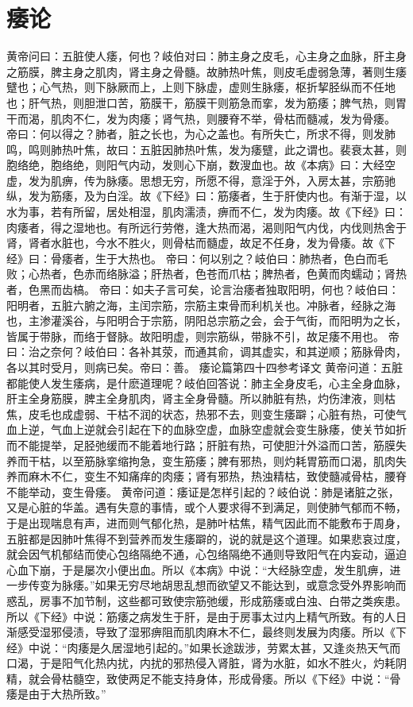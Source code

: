 \documentclass[a4paper,12pt,UTF8,twoside]{ctexbook}
\begin{document}
\chapter{痿论}
黄帝问曰：五脏使人痿，何也？岐伯对曰：肺主身之皮毛，心主身之血脉，肝主身之筋膜，脾主身之肌肉，肾主身之骨髓。故肺热叶焦，则皮毛虚弱急薄，著则生痿躄也；心气热，则下脉厥而上，上则下脉虚，虚则生脉痿，枢折挈胫纵而不任地也；肝气热，则胆泄口苦，筋膜干，筋膜干则筋急而挛，发为筋痿；脾气热，则胃干而渴，肌肉不仁，发为肉痿；肾气热，则腰脊不举，骨枯而髓减，发为骨痿。
帝曰：何以得之？肺者，脏之长也，为心之盖也。有所失亡，所求不得，则发肺鸣，鸣则肺热叶焦，故曰：五脏因肺热叶焦，发为痿躄，此之谓也。裴衰太甚，则胞络绝，胞络绝，则阳气内动，发则心下崩，数溲血也。故《本病》曰：大经空虚，发为肌痹，传为脉痿。思想无穷，所愿不得，意淫于外，入房太甚，宗筋驰纵，发为筋痿，及为白淫。故《下经》曰：筋痿者，生于肝使内也。有渐于湿，以水为事，若有所留，居处相湿，肌肉濡渍，痹而不仁，发为肉痿。故《下经》曰：肉痿者，得之湿地也。有所远行劳倦，逢大热而渴，渴则阳气内伐，内伐则热舍于肾，肾者水脏也，今水不胜火，则骨枯而髓虚，故足不任身，发为骨痿。故《下经》曰：骨痿者，生于大热也。
帝曰：何以别之？岐伯曰：肺热者，色白而毛败；心热者，色赤而络脉溢；肝热者，色苍而爪枯；脾热者，色黄而肉蠕动；肾热者，色黑而齿槁。
帝曰：如夫子言可矣，论言治痿者独取阳明，何也？岐伯曰：阳明者，五脏六腑之海，主闰宗筋，宗筋主束骨而利机关也。冲脉者，经脉之海也，主渗灌溪谷，与阳明合于宗筋，阴阳总宗筋之会，会于气街，而阳明为之长，皆属于带脉，而络于督脉。故阳明虚，则宗筋纵，带脉不引，故足痿不用也。
帝曰：治之奈何？岐伯曰：各补其荥，而通其俞，调其虚实，和其逆顺；筋脉骨肉，各以其时受月，则病已矣。帝曰：善。
痿论篇第四十四参考译文
黄帝问道：五脏都能使人发生痿病，是什麽道理呢？岐伯回答说：肺主全身皮毛，心主全身血脉，肝主全身筋膜，脾主全身肌肉，肾主全身骨髓。所以肺脏有热，灼伤津液，则枯焦，皮毛也成虚弱、干枯不润的状态，热邪不去，则变生痿躃；心脏有热，可使气血上逆，气血上逆就会引起在下的血脉空虚，血脉空虚就会变生脉痿，使关节如折而不能提举，足胫弛缓而不能着地行路；肝脏有热，可使胆汁外溢而口苦，筋膜失养而干枯，以至筋脉挛缩拘急，变生筋痿；脾有邪热，则灼耗胃筋而口渴，肌肉失养而麻木不仁，变生不知痛痒的肉痿；肾有邪热，热浊精枯，致使髓减骨枯，腰脊不能举动，变生骨痿。
黄帝问道：痿证是怎样引起的？岐伯说：肺是诸脏之张，又是心脏的华盖。遇有失意的事情，或个人要求得不到满足，则使肺气郁而不畅，于是出现喘息有声，进而则气郁化热，是肺叶枯焦，精气因此而不能敷布于周身，五脏都是因肺叶焦得不到营养而发生痿躃的，说的就是这个道理。如果悲哀过度，就会因气机郁结而使心包络隔绝不通，心包络隔绝不通则导致阳气在内妄动，逼迫心血下崩，于是屡次小便出血。所以《本病》中说：“大经脉空虚，发生肌痹，进一步传变为脉痿。”如果无穷尽地胡思乱想而欲望又不能达到，或意念受外界影响而惑乱，房事不加节制，这些都可致使宗筋弛缓，形成筋痿或白浊、白带之类疾患。所以《下经》中说：筋痿之病发生于肝，是由于房事太过内上精气所致。有的人日渐感受湿邪侵渍，导致了湿邪痹阻而肌肉麻木不仁，最终则发展为肉痿。所以《下经》中说：“肉痿是久居湿地引起的。”如果长途跋涉，劳累太甚，又逢炎热天气而口渴，于是阳气化热内扰，内扰的邪热侵入肾脏，肾为水脏，如水不胜火，灼耗阴精，就会骨枯髓空，致使两足不能支持身体，形成骨痿。所以《下经》中说：“骨痿是由于大热所致。”
\end{document}
